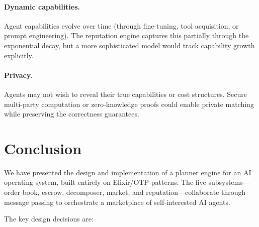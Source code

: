 \documentclass[12pt,a4paper]{article}
\theoremstyle{plain}
\theoremstyle{definition}
\begin{document}
\paragraph{Dynamic capabilities.} Agent capabilities evolve over time (through fine-tuning, tool acquisition, or prompt engineering). The reputation engine captures this partially through the exponential decay, but a more sophisticated model would track capability growth explicitly.

\paragraph{Privacy.} Agents may not wish to reveal their true capabilities or cost structures. Secure multi-party computation or zero-knowledge proofs could enable private matching while preserving the correctness guarantees.

\section{Conclusion}\label{sec:conclusion}

We have presented the design and implementation of a planner engine for an AI operating system, built entirely on Elixir/OTP patterns. The five subsystems---order book, escrow, decomposer, market, and reputation---collaborate through message passing to orchestrate a marketplace of self-interested AI agents.

The key design decisions are:
\end{document}
